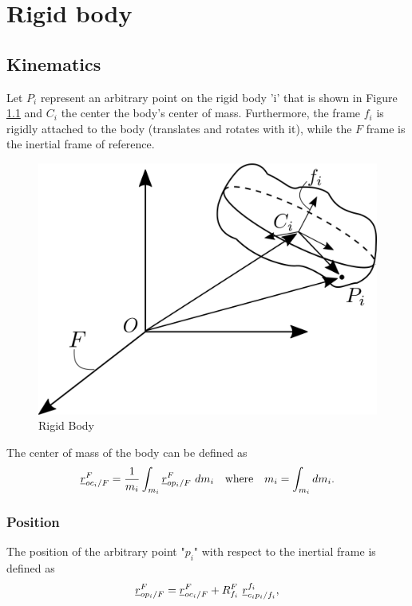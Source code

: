\chapter{Rigid body}

\section{Kinematics}

Let $P_{i}$ represent an arbitrary point on the rigid body 'i' that is 
shown in Figure \ref{fig:rigid_body} and $C_{i}$ the center the body's center of 
mass. Furthermore, the frame $f_{i}$ is rigidly attached to the body (translates
and rotates with it), while the $F$ frame is the inertial frame of reference.

\begin{figure}[h]
    \centering\includegraphics[scale=0.2]{Images/rigid_body_diagram.png}
    \caption{Rigid Body}
    \label{fig:rigid_body}
\end{figure}

The center of mass of the body can be defined as
\[
    \pvec{r}{oc_{i}}{F}{F} = \frac{1}{m_{i}}\int_{m_i} \pvec{r}{op_{i}}{F}{F} \  dm_{i}
    \quad \text{where} \quad m_{i} = \int_{m_i} dm_{i}.
\]

\subsection{Position}
The position of the arbitrary point "$p_{i}$" with respect to the inertial frame 
is defined as
\begin{equation}    
    \pvec{r}{op_{i}}{F}{F} = \pvec{r}{oc_{i}}{F}{F} + \rot{R}{f_{i}}{F} \  \pvec{r}{c_{i}p_{i}}{f_i}{f_i},
    \label{eq:position_rigid_body}
\end{equation}

